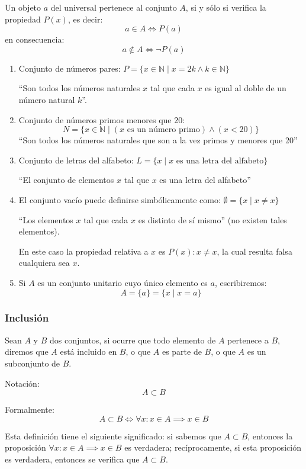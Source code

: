 Un objeto $a$ del universal pertenece al conjunto $A$, si y sólo si verifica la propiedad $P(x)$, es decir:
\[ a \in A \iff P(a) \]
en consecuencia:
\[ a \not \in A \iff \neg P(a) \]

\begin{fmd-example}
	\begin{enumerate}
		\item Conjunto de números pares: \(P = \{x \in \mathbb{N} \mid x = 2 k \land k \in \mathbb{N} \}\)
		
		``Son todos los números naturales $x$ tal que cada $x$ es igual al doble de un número natural $k$''.
		
		\item Conjunto de números primos menores que 20: \[N = \{x \in \mathbb{N} \mid (x \mbox{ es un número primo}) \land (x < 20) \}\]
		``Son todos los números naturales que son a la vez primos y menores que 20''
		
		\item Conjunto de letras del alfabeto: \(L = \{x \mid x \mbox{ es una letra del alfabeto}\}\)
		
		``El conjunto de elementos $x$ tal que $x$ es una letra del alfabeto''
		
		\item El conjunto vacío puede definirse simbólicamente como: $\emptyset = \{ x \mid x \ne x \}$
		
		``Los elementos $x$ tal que cada $x$ es distinto de sí mismo'' (no existen tales elementos).
		
		En este caso la propiedad relativa a $x$ es $P(x): x \ne x$, la cual resulta falsa cualquiera sea $x$.
		
		\item Si $A$ es un conjunto unitario cuyo único elemento es $a$, escribiremos:
		\[ A = \{ a\} = \{ x \mid x = a \} \]
	\end{enumerate}
\end{fmd-example}

\subsubsection{Inclusión}

\begin{fmd-definition}[Inclusión]
	Sean $A$ y $B$ dos conjuntos, si ocurre que todo elemento de $A$ pertenece a $B$, diremos que $A$ está incluido en $B$, o que $A$ es parte de $B$, o que $A$ es un subconjunto de $B$.
	
	Notación:  \[A \subset B\]
	
	Formalmente:
	\[ A \subset B \iff \forall x : x \in A \implies x \in B \]
	
	Esta definición tiene el siguiente significado: si sabemos que $A \subset B$, entonces la proposición $ \forall x : x \in A \implies x \in B$ es verdadera; recíprocamente, si esta proposición es verdadera, entonces se verifica que $A \subset B$.
\end{fmd-definition}

